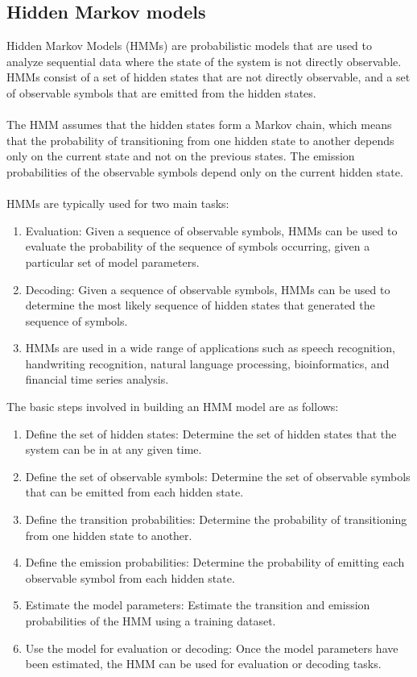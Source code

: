        \subsection{Hidden Markov models} \label{subsec:hhm}
        Hidden Markov Models (HMMs) are probabilistic models that are used to analyze sequential data where the state of the system is not directly observable.
        HMMs consist of a set of hidden states that are not directly observable, and a set of observable symbols that are emitted from the hidden states.\\
        \\
        The HMM assumes that the hidden states form a Markov chain, which means that the probability of transitioning from one hidden state to another
        depends only on the current state and not on the previous states. The emission probabilities of the observable symbols depend
        only on the current hidden state.\\
        \\
        HMMs are typically used for two main tasks:
        \begin{enumerate}
            \item Evaluation: Given a sequence of observable symbols, HMMs can be used to evaluate the probability of the sequence of symbols occurring, given a particular set of model parameters.
            \item Decoding: Given a sequence of observable symbols, HMMs can be used to determine the most likely sequence of hidden states that generated the sequence of symbols.
            \item HMMs are used in a wide range of applications such as speech recognition, handwriting recognition, natural language processing, bioinformatics, and financial time series analysis.
        \end{enumerate}
        The basic steps involved in building an HMM model are as follows:
        \begin{enumerate}
            \item Define the set of hidden states: Determine the set of hidden states that the system can be in at any given time.
            \item Define the set of observable symbols: Determine the set of observable symbols that can be emitted from each hidden state.
            \item Define the transition probabilities: Determine the probability of transitioning from one hidden state to another.
            \item Define the emission probabilities: Determine the probability of emitting each observable symbol from each hidden state.
            \item Estimate the model parameters: Estimate the transition and emission probabilities of the HMM using a training dataset.
            \item Use the model for evaluation or decoding: Once the model parameters have been estimated, the HMM
            can be used for evaluation or decoding tasks.
        \end{enumerate}
